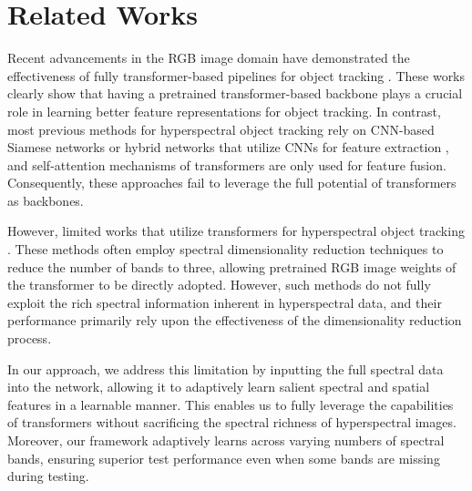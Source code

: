\section{Related Works}
\label{sec:format}
Recent advancements in the RGB image domain have demonstrated the effectiveness of fully transformer-based pipelines for object tracking \cite{lin2022swintrack, cui2024mixformerv2}. These works clearly show that having a pretrained transformer-based backbone plays a crucial role in learning better feature representations for object tracking. In contrast, most previous methods for hyperspectral object tracking rely on CNN-based Siamese networks or hybrid networks that utilize CNNs for feature extraction \cite{MMF-Net, TransDAT}, and self-attention mechanisms of transformers are only used for feature fusion. Consequently, these approaches fail to leverage the full potential of transformers as backbones.

However, limited works that utilize transformers for hyperspectral object tracking \cite{TBR-Net, SPIRIT}. These methods often employ spectral dimensionality reduction techniques to reduce the number of bands to three, allowing pretrained RGB image weights of the transformer to be directly adopted. However, such methods do not fully exploit the rich spectral information inherent in hyperspectral data, and their performance primarily rely upon the effectiveness of the dimensionality reduction process.

In our approach, we address this limitation by inputting the full spectral data into the network, allowing it to adaptively learn salient spectral and spatial features in a learnable manner. This enables us to fully leverage the capabilities of transformers without sacrificing the spectral richness of hyperspectral images. Moreover, our framework adaptively learns across varying numbers of spectral bands, ensuring superior test performance even when some bands are missing during testing. 
\vspace{-0.1cm}